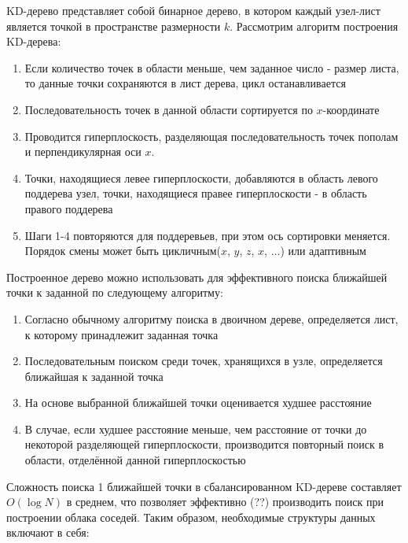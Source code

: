 KD-дерево представляет собой бинарное дерево, в котором каждый узел-лист
является точкой в пространстве размерности $k$. Рассмотрим алгоритм построения
KD-дерева:

\begin{enumerate}
    \item Если количество точек в области меньше, чем заданное число - размер
    листа, то данные точки сохраняются в лист дерева, цикл останавливается
    \item Последовательность точек в данной области сортируется по
    $x$-координате
    \item Проводится гиперплоскость, разделяющая последовательность точек
    пополам и перпендикулярная оси $x$.
    \item Точки, находящиеся левее гиперплоскости, добавляются в область левого
    поддерева узел, точки, находящиеся правее гиперплоскости - в область правого
    поддерева
    \item Шаги 1-4 повторяются для поддеревьев, при этом ось сортировки
    меняется. Порядок смены может быть цикличным($x$, $y$, $z$, $x$, $\dots$)
    или адаптивным
\end{enumerate}

Построенное дерево можно использовать для эффективного поиска ближайшей точки к
заданной по следующему алгоритму:

\begin{enumerate}
    \item Согласно обычному алгоритму поиска в двоичном дереве, определяется
    лист, к которому принадлежит заданная точка
    \item Последовательным поиском среди точек, хранящихся в узле, определяется
    ближайшая к заданной точка
    \item На основе выбранной ближайшей точки оценивается худшее расстояние
    \item В случае, если худшее расстояние меньше, чем расстояние от точки до
    некоторой разделяющей гиперплоскости, производится повторный поиск в
    области, отделённой данной гиперплоскостью
\end{enumerate}

Сложность поиска 1 ближайшей точки в сбалансированном KD-дереве составляет
$O\left(\log N\right)$ в среднем\cite[25]{PointCloudAnalysis}, что позволяет
эффективно (??) производить поиск при построении облака соседей. Таким образом,
необходимые структуры данных включают в себя:

